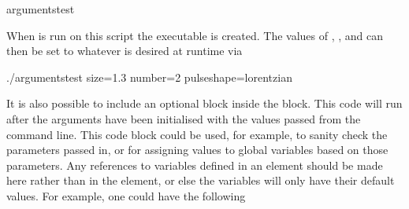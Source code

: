 \documentclass[letterpaper,10pt,english]{sphinxmanual}
\begin{document}
\begin{sphinxVerbatim}[commandchars=\\\{\}]
 arguments\PYGZus{}test 
       
       
       
\end{sphinxVerbatim}

\sphinxAtStartPar
When  is run on this script the executable  is created. The values of , , and  can then be set to whatever is desired at runtime via

\begin{sphinxVerbatim}[commandchars=\\\{\}]
./arguments\PYGZus{}test \PYGZhy{}\PYGZhy{}size=1.3 \PYGZhy{}\PYGZhy{}number=2 \PYGZhy{}\PYGZhy{}pulse\PYGZus{}shape=lorentzian
\end{sphinxVerbatim}

\sphinxAtStartPar
It is also possible to include an optional  block inside the  block. This code will run after the arguments have been initialised with the values passed from the command line. This code block could be used, for example, to sanity check the parameters passed in, or for assigning values to global variables based on those parameters.  Any references to variables defined in an  element should be made here rather than in the {\hyperref[\detokenize{reference_elements:globals}]{}} element, or else the variables will only have their default values.  For example, one could have the following
\end{document}
